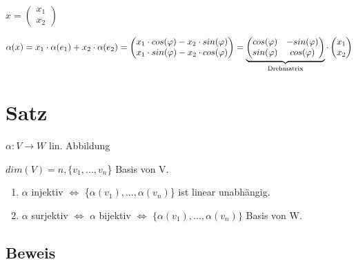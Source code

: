 \documentclass[a4paper, openany]{book}
\begin{document}
      $x = \begin{pmatrix}x_1 \\ x_2 \end{pmatrix}$

      $\alpha(x) = x_1 \cdot \alpha(e_1) + x_2 \cdot \alpha(e_2) = \begin{pmatrix}x_1 \cdot cos(\varphi) - x_2 \cdot sin(\varphi) \\ x_1 \cdot sin(\varphi) - x_2 \cdot cos(\varphi) \end{pmatrix} = \underbrace{\begin{pmatrix}cos(\varphi) & - sin(\varphi) \\ sin(\varphi) & cos(\varphi) \end{pmatrix}}_{\textnormal{Drehmatrix}} \cdot \begin{pmatrix}x_1 \\ x_2 \end{pmatrix}$

      \section{Satz}

      $\alpha: V \rightarrow W$ lin. Abbildung

      $dim(V) = n, \{v_1, ..., v_n$\} Basis von V.

      \begin{enumerate}[label=(\alph*)]
        \item $\alpha$ injektiv $\Leftrightarrow$ \{$\alpha(v_1), ..., \alpha(v_n)$\} ist linear unabhängig. 
        \item $\alpha$ surjektiv $\Leftrightarrow$ $\alpha$ bijektiv $\Leftrightarrow$ $\{\alpha(v_1), ..., \alpha(v_n)\}$ Basis von W.
      \end{enumerate}

      \subsection*{Beweis}
\end{document}
